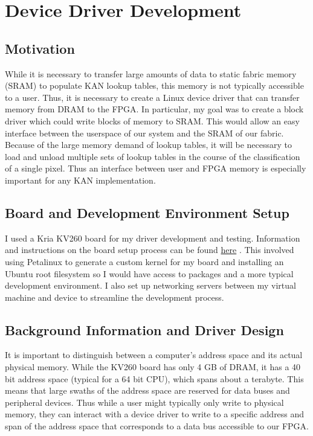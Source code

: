 \documentclass[psamsfonts]{amsart}
\newcommand{\mycomment}[1]{}
\theoremstyle{definition}
\theoremstyle{remark}
\numberwithin{equation}{section}
\begin{document}
\section{Device Driver Development}

\subsection{Motivation}
While it is necessary to transfer large amounts of data to static fabric memory (SRAM) to populate KAN lookup tables, this memory is not typically accessible to a user. Thus, it is necessary to create a Linux device driver that can transfer memory from DRAM to the FPGA. In particular, my goal was to create a block driver which could write blocks of memory to SRAM\mycomment{This is not even what I ended up writing lol}. This would allow an easy interface between the userspace of our system and the SRAM of our fabric. Because of the large memory demand of lookup tables, it will be necessary to load and unload multiple sets of lookup tables in the course of the classification of a single pixel. Thus an interface between user and FPGA memory is especially important for any KAN implementation.

\subsection{Board and Development Environment Setup}
I used a Kria KV260 board for my driver development and testing. Information and instructions on the board setup process can be found \href{https://github.com/night1rider/Xilinx-KR260-Intro/blob/Hello-World/Documentation/00_hello_world_kr260.md}{here} \cite{board-setup}. This involved using Petalinux to generate a custom kernel for my board and installing an Ubuntu root filesystem so I would have access to packages and a more typical development environment. I also set up networking servers between my virtual machine and device to streamline the development process.

\subsection{Background Information and Driver Design}
It is important to distinguish between a computer's address space and its actual physical memory. While the KV260 board has only 4 GB of DRAM, it has a 40 bit address space (typical for a 64 bit CPU), which spans about a terabyte. This means that large swaths of the address space are reserved for data buses and peripheral devices. Thus while a user might typically only write to physical memory, they can interact with a device driver to write to a specific address and span of the address space that corresponds to a data bus accessible to our FPGA.
\end{document}
